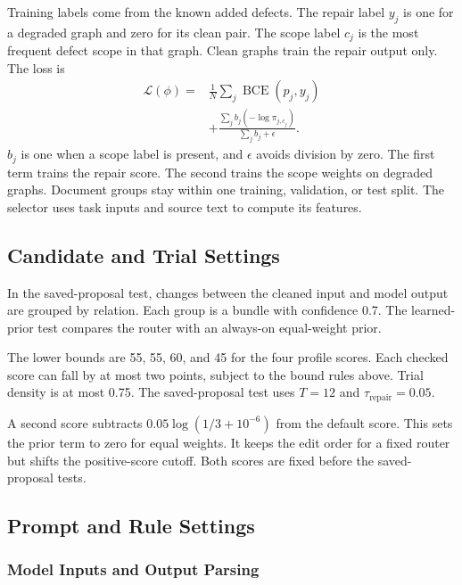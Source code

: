 Training labels come from the known added defects.
The repair label $y_j$ is one for a degraded graph and zero for its clean pair.
The scope label $c_j$ is the most frequent defect scope in that graph.
Clean graphs train the repair output only.
The loss is
\begin{equation}
\label{eq:decision_loss}
\begin{split}
\mathcal L(\phi)={}&\frac1N\sum_j\operatorname{BCE}(p_j,y_j)\\
&+\frac{\sum_j b_j(-\log\pi_{j,c_j})}{\sum_j b_j+\epsilon}.
\end{split}
\end{equation}
$b_j$ is one when a scope label is present, and $\epsilon$ avoids division by zero.
The first term trains the repair score.
The second trains the scope weights on degraded graphs.
Document groups stay within one training, validation, or test split.
The selector uses task inputs and source text to compute its features.

\subsection{Candidate and Trial Settings}

In the saved-proposal test, changes between the cleaned input and model
output are grouped by relation. Each group is a bundle with confidence 0.7.
The learned-prior test compares the router with an always-on equal-weight prior.

The lower bounds are 55, 55, 60, and 45 for the four profile scores.
Each checked score can fall by at most two points, subject to the bound
rules above. Trial density is at most 0.75.
The saved-proposal test uses $T=12$ and $\tau_{\mathrm{repair}}=0.05$.

A second score subtracts $0.05\log(1/3+10^{-6})$ from the default score.
This sets the prior term to zero for equal weights.
It keeps the edit order for a fixed router but shifts the positive-score cutoff.
Both scores are fixed before the saved-proposal tests.

\subsection{Prompt and Rule Settings}
\label{sec:impl:enhancement}

\subsubsection{Model Inputs and Output Parsing}
\label{sec:impl:assessment}

